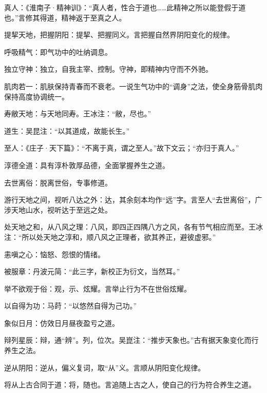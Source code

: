 \documentclass[draft,12pt]{ctexbook}
\begin{document}
\begin{jiaozhu}
  \item 真人：《淮南子·精神训》：“真人者，性合于道也……此精神之所以能登假于道也。”言修其得道，精神返于至真之人。
  \item 提挈天地，把握阴阳：提挈、把握同义。言把握自然界阴阳变化的规侓。
  \item 呼吸精气：即气功中的吐纳调息。
  \item 独立守神：独立，自我主宰、控制。守神，即精神内守而不外驰。
  \item 肌肉若一：肌肤保持青春而不衰老。一说生气功中的“调身”之法，使全身筋骨肌肉保持高度协调统一。
  \item 寿敝天地：与天地同寿。王冰注：“敝，尽也。”
  \item 道生：吴昆注：“以其道成，故能长生。”
  \item 至人：《庄子·天下篇》：“不离于真，谓之至人。”故下文云；“亦归于真人。”
  \item 淳德全道：具有淳朴敦厚品德，全面掌握养生之道。
  \item 去世离俗：脱离世俗，专事修道。
  \item 游行天地之间，视听八达之外：达，其余刻本均作“远”字。言至人“去世离俗”，广涉天地山水，视听达于至远之处。
  \item 处天地之和，从八风之理：八风，即四正四隅八方之风，各有节气相应而至。王冰注：“所以处天地之淳和，顺八风之正理者，欲其养正，避彼虚邪。”
  \item 恚嗔之心：恼怒、怨恨的情绪。
  \item 被服章：丹波元简：“此三字，新校正为衍文，当然耳。”
  \item 举不欲观于俗：观，示、炫耀。言举止行为不在世俗炫耀。
  \item 以自得为功：马莳：“以悠然自得为己功。”
  \item 象似日月：仿效日月昼夜盈亏之道。
  \item 辩列星辰：辩，通“辨”。列，位次。吴崑注：“推步天象也。”古有据天象变化而行养生之法。
  \item 逆从阴阳：逆从，偏义复词，取“从”义。言顺从阴阳变化规律。
  \item 将从上古合同于道：将，随也。言追随上古之人，使自己的行为符合养生之道。
\end{jiaozhu}


\end{document}
